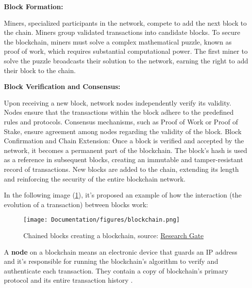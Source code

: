 \textbf{Block Formation:}\newline

Miners, specialized participants in the network, compete to add the next block to the chain.
Miners group validated transactions into candidate blocks.\newline
To secure the blockchain, miners must solve a complex mathematical puzzle, known as proof of work, which requires substantial computational power.
The first miner to solve the puzzle broadcasts their solution to the network, earning the right to add their block to the chain.\newline

\textbf{Block Verification and Consensus:}\newline

Upon receiving a new block, network nodes independently verify its validity.
Nodes ensure that the transactions within the block adhere to the predefined rules and protocols.
Consensus mechanisms, such as Proof of Work or Proof of Stake, ensure agreement among nodes regarding the validity of the block.
Block Confirmation and Chain Extension:
Once a block is verified and accepted by the network, it becomes a permanent part of the blockchain.
The block's hash is used as a reference in subsequent blocks, creating an immutable and tamper-resistant record of transactions.
New blocks are added to the chain, extending its length and reinforcing the security of the entire blockchain network.\newline

In the following image (\ref{fig:blocks}), it's proposed an example of how the interaction (the evolution of a transaction) between blocks work:\newline

\begin{figure}[htbp]
	\centering
	\texttt{[image: Documentation/figures/blockchain.png]}  %
	\caption{Chained blocks creating a blockchain, source: \href{https://www.researchgate.net/figure/Blockchain-design-structure-showing-chained-blocks-with-header-and-body-fields_fig2_321017113}{Research Gate}}
	\label{fig:blocks}
\end{figure}

A \textbf{node} on a blockchain means an electronic device that guards an IP address and it's responsible for running the blockchain's algorithm to verify and authenticate each transaction. They contain a copy of blockchain's primary protocol and its entire transaction history \cite{node}.\newline

